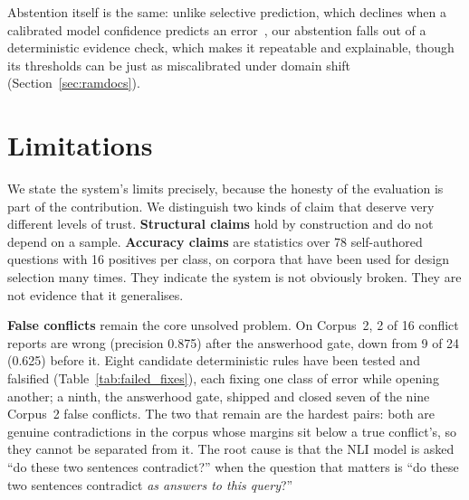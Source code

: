 \documentclass[conference]{IEEEtran}
\begin{document}
Abstention itself is the same: unlike selective prediction, which declines
when a calibrated model confidence predicts an error~\cite{kamath2020selective},
our abstention falls out of a deterministic evidence check, which makes it
repeatable and explainable, though its thresholds can be just as
miscalibrated under domain shift (Section~\ref{sec:ramdocs}).

\section{Limitations}
\label{sec:limitations}

We state the system's limits precisely, because the honesty of the
evaluation is part of the contribution. We distinguish two kinds of
claim that deserve very different levels of trust. \textbf{Structural
claims} hold by construction and do not depend on a sample.
\textbf{Accuracy claims} are statistics over 78 self-authored questions
with 16 positives per class, on corpora that have been used for design
selection many times. They indicate the system is not obviously broken.
They are not evidence that it generalises.

\textbf{False conflicts} remain the core unsolved problem. On Corpus~2,
2 of 16 conflict reports are wrong (precision 0.875) after the answerhood
gate, down from 9 of 24 (0.625) before it. Eight candidate deterministic
rules have been tested and falsified (Table~\ref{tab:failed_fixes}), each
fixing one class of error while opening another; a ninth, the answerhood
gate, shipped and closed seven of the nine Corpus~2 false conflicts. The two
that remain are the hardest pairs: both are genuine contradictions in the
corpus whose margins sit below a true conflict's, so they cannot be
separated from it. The root cause is that the NLI model is asked ``do
these two sentences contradict?'' when the question that matters is
``do these two sentences contradict \textit{as answers to this
query}?''
\end{document}
